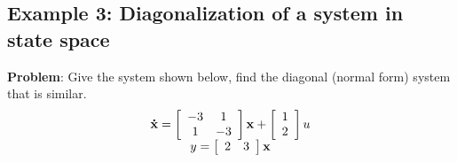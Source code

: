 \subsection*{Example 3: Diagonalization of a system in state space} %
\label{ssub:example_2}

\textbf{Problem}: Give the system shown below, find the diagonal (normal form) system that is similar.
\[
\begin{array}{c}
 {\bf{\dot x}} = \left[ {\begin{array}{*{20}c}
   { - 3} & 1  \\
   1 & { - 3}  \\
\end{array}} \right]{\bf{x}} + \left[ {\begin{array}{*{20}c}
   1  \\
   2  \\
\end{array}} \right]u \\ 
 y = \left[ {\begin{array}{*{20}c}
   2 & 3  \\
\end{array}} \right]{\bf{x}} \\ 
 \end{array}
\]


